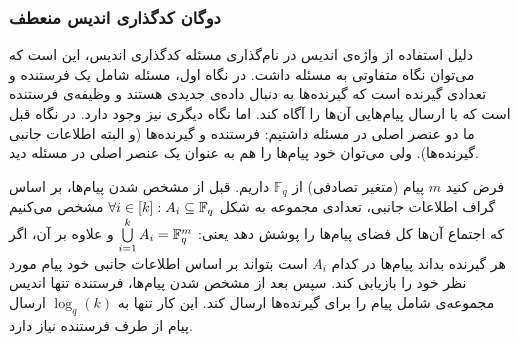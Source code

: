 \subsubsection{
		دوگان کدگذاری اندیس منعطف
}
\begin{recal}
	دلیل استفاده از واژه‌ی اندیس در نام‌گذاری مسئله کدگذاری اندیس، این است که می‌توان نگاه متفاوتی به مسئله داشت. در نگاه اول، مسئله شامل یک فرستنده و تعدادی گیرنده است که گیرنده‌ها به دنبال داده‌ی جدیدی هستند و وظیفه‌ی فرستنده است که با ارسال پیام‌هایی آن‌ها را آگاه کند. اما نگاه دیگری نیز وجود دارد. در نگاه قبل ما دو عنصر اصلی در مسئله داشتیم: فرستنده و گیرنده‌ها (و البته اطلاعات جانبی گیرنده‌ها). ولی می‌توان خود پیام‌ها را هم به عنوان یک عنصر اصلی در مسئله دید.
	
فرض کنید 
$m$
پیام (متغیر‌ تصادفی) از
$\mathbb{F}_q$
 داریم. قبل از مشخص شدن پیام‌ها، بر اساس گراف اطلاعات جانبی، تعدادی مجموعه به شکل
 $\forall i \in [k]: A_i \subseteq \mathbb{F}_q$
 مشخص می‌کنیم که اجتماع آن‌ها کل فضای پیام‌ها را پوشش دهد یعنی:
 $ \bigcup\limits_{i = 1}^k A_i = \mathbb{F}_q^m $
 و علاوه بر آن، اگر هر گیرنده بداند پیام‌ها در کدام
 $A_i$
 است بتواند بر اساس اطلاعات جانبی خود پیام مورد نظر خود را بازیابی کند. سپس بعد از مشخص شدن پیام‌ها، فرستنده تنها اندیس مجموعه‌ی شامل پیام را برای گیرنده‌ها ارسال کند. این کار تنها به
 $\log_q(k)$
 ارسال پیام از طرف فرستنده نیاز دارد.
\end{recal}
